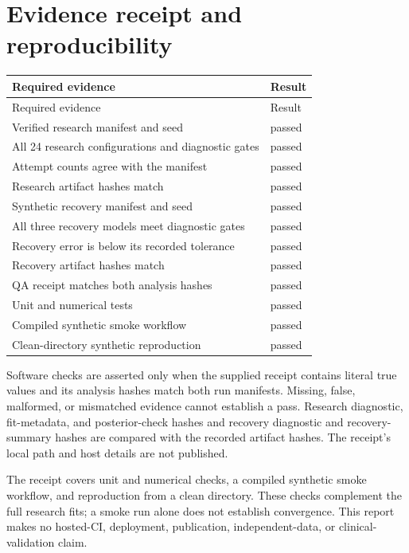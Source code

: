 \documentclass[11pt,letterpaper]{article}
\begin{document}
\section{Evidence receipt and reproducibility}
\begingroup\small\setlength{\tabcolsep}{5pt}\begin{longtable}{>{\raggedright\arraybackslash}p{}l}\toprule
Required evidence & Result \\
\midrule\endfirsthead\toprule
Required evidence & Result \\
\midrule\endhead\bottomrule\endfoot
Verified research manifest and seed & passed \\
All 24 research configurations and diagnostic gates & passed \\
Attempt counts agree with the manifest & passed \\
Research artifact hashes match & passed \\
Synthetic recovery manifest and seed & passed \\
All three recovery models meet diagnostic gates & passed \\
Recovery error is below its recorded tolerance & passed \\
Recovery artifact hashes match & passed \\
QA receipt matches both analysis hashes & passed \\
Unit and numerical tests & passed \\
Compiled synthetic smoke workflow & passed \\
Clean-directory synthetic reproduction & passed \\
\end{longtable}\endgroup
Software checks are asserted only when the supplied receipt contains literal true values and its analysis hashes match both run manifests. Missing, false, malformed, or mismatched evidence cannot establish a pass. Research diagnostic, fit-metadata, and posterior-check hashes and recovery diagnostic and recovery-summary hashes are compared with the recorded artifact hashes. The receipt's local path and host details are not published.

The receipt covers unit and numerical checks, a compiled synthetic smoke workflow, and reproduction from a clean directory. These checks complement the full research fits; a smoke run alone does not establish convergence. This report makes no hosted-CI, deployment, publication, independent-data, or clinical-validation claim.
\end{document}

